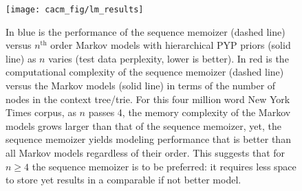 \documentclass{beamer}
\begin{document}
\begin{frame}
\begin{figure}
    \texttt{[image: cacm\_fig/lm\_results]}
    \caption{\tiny In blue is the performance of
    the sequence memoizer (dashed line) versus $n^{\textrm{th}}$ order Markov models with hierarchical PYP priors (solid line)
    as $n$ varies (test data perplexity, lower
    is better).  In red is the computational
    complexity of the sequence memoizer (dashed line) versus the Markov models (solid line) in
    terms of  the number of nodes in the context tree/trie. %
    For this four million word New York Times corpus, as $n$ passes 4, the memory complexity of the Markov models grows larger than that of the sequence
    memoizer, yet, the sequence memoizer yields modeling
    performance that is better than all Markov models regardless of their order. %
    This suggests that for $n\ge 4$ the sequence memoizer is to be preferred: it
    requires less space to store yet results in a comparable if not better
    model.} 
    \label{fig:sm_vs_ngram}
\end{figure}
\end{frame}
\end{document}
